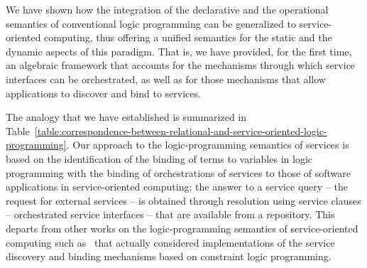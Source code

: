 \documentclass{LMCS}
\begin{document}
  We have shown how the integration of the declarative and the operational semantics of conventional logic programming can be generalized to service-oriented computing, thus offering a unified semantics for the static and the dynamic aspects of this paradigm.  That is, we have provided, for the first time, an algebraic framework that accounts for the mechanisms through which service interfaces can be orchestrated, as well as for those mechanisms that allow applications to discover and bind to services.

  The analogy that we have established is summarized in Table~\ref{table:correspondence-between-relational-and-service-oriented-logic-programming}.
  Our approach to the logic-programming semantics of services is based on the identification of the binding of terms to variables in logic programming with the binding of orchestrations of services to those of software applications in service-oriented computing; the answer to a service query -- the request for external services -- is obtained through resolution using service clauses -- orchestrated service interfaces -- that are available from a repository.
  This departs from other works on the logic-programming semantics of service-oriented computing such as~\cite{Kona-Bansal-Gupta:Automatic-composition-of-semantic-Web-services-2007} that actually considered implementations of the service discovery and binding mechanisms based on constraint logic programming.
\end{document}
